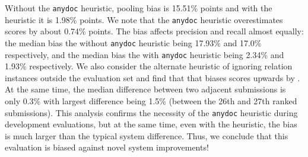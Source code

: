 Without the \texttt{anydoc} heuristic, pooling bias is 15.51\% \fone{} points and with the heuristic it is 1.98\% \fone{} points.
We note that the \texttt{anydoc} heuristic overestimates scores by about 0.74\% \fone{} points.
The bias affects precision and recall almost equally: 
  the median bias the without \texttt{anydoc} heuristic being 17.93\% and 17.0\% respectively, and
  the median bias the with \texttt{anydoc} heuristic being 2.34\% and 1.93\% respectively.
We also consider the alternate heuristic of ignoring relation instances outside the evaluation set and find that that biases \fone{} scores upwards by .
At the same time, the median difference between two adjacent submissions is only 0.3\%\fone{} with largest difference being 1.5\% \fone{} (between the 26th and 27th ranked submissions).
This analysis confirms the necessity of the \texttt{anydoc} heuristic during development evaluations,
  but at the same time, even with the heuristic, the bias is much larger than the typical system difference.
Thus, we conclude that this evaluation is biased against novel system improvements!

%


